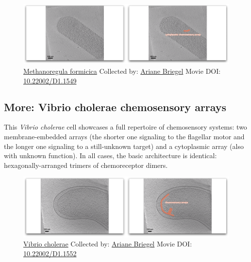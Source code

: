 \documentclass[]{tufte-book}
\begin{document}
\begin{figure}
\includegraphics{movie_stills/7_5} \caption[\protect\hyperlink{tree}{Methanoregula formicica} Collected
by: \protect\hyperlink{ariane_briegel}{Ariane Briegel} Movie DOI:
\href{https://doi.org/10.22002/D1.1549}{10.22002/D1.1549}]{\protect\hyperlink{tree}{Methanoregula formicica} Collected
by: \protect\hyperlink{ariane_briegel}{Ariane Briegel} Movie DOI:
\href{https://doi.org/10.22002/D1.1549}{10.22002/D1.1549}}\label{fig:7-5}
\end{figure}

\hypertarget{Vibrio_cholerae_chemosensory_arrays}{\subsection*{More:
Vibrio cholerae chemosensory
arrays}\label{Vibrio_cholerae_chemosensory_arrays}}

This \emph{Vibrio cholerae} cell showcases a full repertoire of
chemosensory systems: two membrane-embedded arrays (the shorter one
signaling to the flagellar motor and the longer one signaling to a
still-unknown target) and a cytoplasmic array (also with unknown
function). In all cases, the basic architecture is identical:
hexagonally-arranged trimers of chemoreceptor dimers.





\begin{figure}
\includegraphics{movie_stills/7_5a} \caption[\protect\hyperlink{tree}{Vibrio cholerae} Collected by:
\protect\hyperlink{ariane_briegel}{Ariane Briegel} Movie DOI:
\href{https://doi.org/10.22002/D1.1552}{10.22002/D1.1552}]{\protect\hyperlink{tree}{Vibrio cholerae} Collected by:
\protect\hyperlink{ariane_briegel}{Ariane Briegel} Movie DOI:
\href{https://doi.org/10.22002/D1.1552}{10.22002/D1.1552}}\label{fig:7-5a}
\end{figure}
\end{document}
